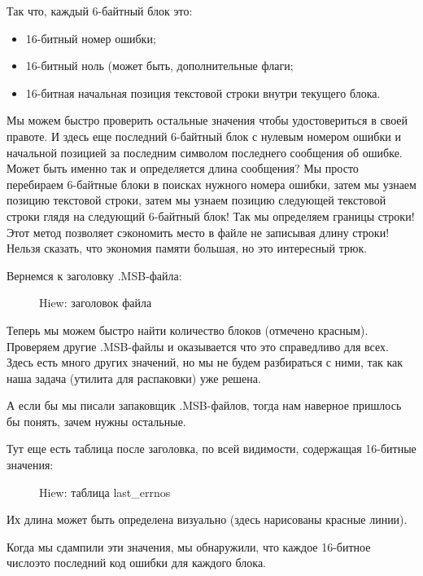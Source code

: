 Так что, каждый 6-байтный блок это:

\begin{itemize}
\item 16-битный номер ошибки; 
\item 16-битный ноль (может быть, дополнительные флаги; 
\item 16-битная начальная позиция текстовой строки внутри текущего блока.
\end{itemize}

Мы можем быстро проверить остальные значения чтобы удостовериться в своей правоте.
И здесь еще последний  6-байтный блок с нулевым номером ошибки и начальной позицией за последним
символом последнего сообщения об ошибке.
Может быть именно так и определяется длина сообщения?
Мы просто перебираем 6-байтные блоки в поисках нужного номера ошибки, затем
мы узнаем позицию текстовой строки, затем мы узнаем позицию следующей текстовой строки глядя на
следующий 6-байтный блок!
Так мы определяем границы строки!
Этот метод позволяет сэкономить место в файле не записывая длину строки!
Нельзя сказать, что экономия памяти большая, но это интересный трюк.

\clearpage
Вернемся к заголовку .MSB-файла:

\begin{figure}[H]
\centering
{}
\caption{Hiew: заголовок файла}
\label{fig:oracle_MSB_3}
\end{figure}

Теперь мы можем быстро найти количество блоков (отмечено красным).
Проверяем другие .MSB-файлы и оказывается что это справедливо для всех.
Здесь есть много других значений, но мы не будем разбираться с ними, так как наша задача (утилита для распаковки) уже решена.

А если бы мы писали запаковщик .MSB-файлов, тогда нам наверное пришлось бы понять, зачем нужны остальные.

\clearpage
Тут еще есть таблица после заголовка, по всей видимости, содержащая 16-битные значения:

\begin{figure}[H]
\centering
{}
\caption{Hiew: таблица last\_errnos}
\label{fig:oracle_MSB_4}
\end{figure}

Их длина может быть определена визуально (здесь нарисованы красные линии).

Когда мы сдампили эти значения, мы обнаружили, что каждое 16-битное число\EMDASH{}это последний код ошибки для каждого блока.%

